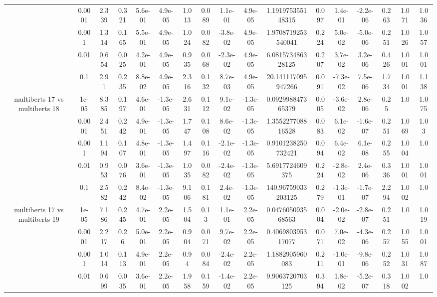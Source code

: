 \begin{tabular}{|c|c|c|c|c|c|c|c|c|c|c|c|c|c|c|c|c|}
 & 0.0001 & 2.339 & 0.321 & 5.6e-01 & 4.9e-05 & 1.013 & 0.089 & 1.1e-01 & 4.9e-05 & 1.191975355148315 & 0.097 & 1.4e-01 & -2.2e-06 & 0.263 & 1.071 & 1.036 \\
 & 0.001 & 1.314 & 0.165 & 5.5e-01 & 4.9e-05 & 1.024 & 0.082 & -3.8e-02 & 4.9e-05 & 1.9708719253540041 & 0.224 & 5.0e-02 & -5.0e-06 & 0.251 & 1.026 & 1.057 \\
 & 0.01 & 0.654 & 0.025 & 4.2e-01 & 4.9e-05 & 0.935 & 0.068 & -2.3e-02 & 4.9e-05 & 6.081573486328125 & 0.207 & 3.7e-02 & 3.2e-06 & 0.426 & 1.001 & 1.001 \\
 & 0.1 & 2.91 & 0.235 & 8.8e-02 & 4.9e-05 & 2.316 & 0.132 & 8.7e-03 & 4.9e-05 & 20.141117095947266 & 0.091 & -7.3e-02 & 7.5e-06 & 1.734 & 1.001 & 1.138 \\
\hline
\multirow{5}{*}{multiberts 17 vs multiberts 18} & 1e-05 & 8.385 & 0.197 & 4.6e-01 & -1.3e-05 & 2.631 & 0.112 & 9.1e-02 & -1.3e-05 & 0.092998847365379 & 0.005 & -3.6e-02 & 2.8e-06 & 0.25 & 1.0 & 1.075 \\
 & 0.0001 & 2.451 & 0.242 & 4.9e-01 & -1.3e-05 & 1.747 & 0.108 & 8.6e-02 & -1.3e-05 & 1.355227708816528 & 0.083 & 6.1e-02 & -1.6e-07 & 0.251 & 1.069 & 1.03 \\
 & 0.001 & 1.194 & 0.107 & 4.8e-01 & -1.3e-05 & 1.497 & 0.116 & -2.1e-02 & -1.3e-05 & 0.9101238250732421 & 0.094 & 6.4e-02 & 6.1e-08 & 0.255 & 1.004 & 1.0 \\
 & 0.01 & 0.953 & 0.076 & 3.6e-01 & -1.3e-05 & 1.035 & 0.082 & -2.4e-02 & -1.3e-05 & 5.6917724609375 & 0.224 & -2.8e-02 & 2.4e-06 & 0.336 & 1.001 & 1.001 \\
 & 0.1 & 2.582 & 0.242 & 8.4e-02 & -1.3e-05 & 9.106 & 0.181 & 2.4e-02 & -1.3e-05 & 140.96759033203125 & 0.279 & -1.3e-01 & -1.7e-07 & 2.294 & 1.002 & 1.0 \\
\hline
\multirow{5}{*}{multiberts 17 vs multiberts 19} & 1e-05 & 7.186 & 0.245 & 4.7e-01 & 2.2e-05 & 1.504 & 0.13 & 1.1e-01 & 2.2e-05 & 0.047605093568563 & 0.004 & -2.0e-02 & -2.8e-07 & 0.251 & 1.0 & 1.019 \\
 & 0.0001 & 2.217 & 0.26 & 5.0e-01 & 2.2e-05 & 0.904 & 0.071 & 9.7e-02 & 2.2e-05 & 0.406980395317077 & 0.071 & 7.0e-02 & -4.3e-06 & 0.257 & 1.055 & 1.001 \\
 & 0.001 & 1.014 & 0.113 & 4.9e-01 & 2.2e-05 & 0.94 & 0.084 & -2.4e-02 & 2.2e-05 & 1.1882905960083 & 0.211 & -1.0e-01 & -9.8e-06 & 0.252 & 1.031 & 1.087 \\
 & 0.01 & 0.699 & 0.035 & 3.6e-01 & 2.2e-05 & 1.958 & 0.159 & -1.4e-02 & 2.2e-05 & 9.9063720703125 & 0.394 & 1.8e-02 & -5.2e-07 & 0.318 & 1.002 & 1.0 \\

\end{tabular}
